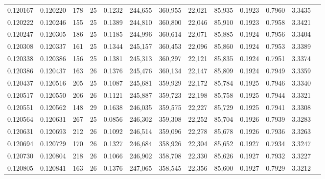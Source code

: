 \begin{tabular}{rrrrrrrrrrrrr}
0.120167 & 0.120220 & 178 &  25 &                                     0.1232 & 244,655 & 360,955 &  22,021 &  85,935 & 0.1923 & 0.7960 & 3.3435 \\
0.120222 & 0.120246 & 155 &  25 &                                     0.1389 & 244,810 & 360,800 &  22,046 &  85,910 & 0.1923 & 0.7958 & 3.3421 \\
0.120247 & 0.120305 & 186 &  25 &                                     0.1185 & 244,996 & 360,614 &  22,071 &  85,885 & 0.1924 & 0.7956 & 3.3404 \\
0.120308 & 0.120337 & 161 &  25 &                                     0.1344 & 245,157 & 360,453 &  22,096 &  85,860 & 0.1924 & 0.7953 & 3.3389 \\
0.120338 & 0.120386 & 156 &  25 &                                     0.1381 & 245,313 & 360,297 &  22,121 &  85,835 & 0.1924 & 0.7951 & 3.3374 \\
0.120386 & 0.120437 & 163 &  26 &                                     0.1376 & 245,476 & 360,134 &  22,147 &  85,809 & 0.1924 & 0.7949 & 3.3359 \\
0.120437 & 0.120516 & 205 &  25 &                                     0.1087 & 245,681 & 359,929 &  22,172 &  85,784 & 0.1925 & 0.7946 & 3.3340 \\
0.120517 & 0.120550 & 206 &  26 &                                     0.1121 & 245,887 & 359,723 &  22,198 &  85,758 & 0.1925 & 0.7944 & 3.3321 \\
0.120551 & 0.120562 & 148 &  29 &                                     0.1638 & 246,035 & 359,575 &  22,227 &  85,729 & 0.1925 & 0.7941 & 3.3308 \\
0.120564 & 0.120631 & 267 &  25 &                                     0.0856 & 246,302 & 359,308 &  22,252 &  85,704 & 0.1926 & 0.7939 & 3.3283 \\
0.120631 & 0.120693 & 212 &  26 &                                     0.1092 & 246,514 & 359,096 &  22,278 &  85,678 & 0.1926 & 0.7936 & 3.3263 \\
0.120694 & 0.120729 & 170 &  26 &                                     0.1327 & 246,684 & 358,926 &  22,304 &  85,652 & 0.1927 & 0.7934 & 3.3247 \\
0.120730 & 0.120804 & 218 &  26 &                                     0.1066 & 246,902 & 358,708 &  22,330 &  85,626 & 0.1927 & 0.7932 & 3.3227 \\
0.120805 & 0.120841 & 163 &  26 &                                     0.1376 & 247,065 & 358,545 &  22,356 &  85,600 & 0.1927 & 0.7929 & 3.3212 \\

\end{tabular}
